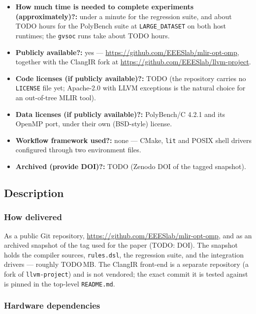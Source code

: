 {\begin{itemize}
    essentially all of it the LLVM build.
  \item {\bf How much time is needed to complete experiments (approximately)?: }
    under a minute for the regression suite, and about TODO hours for the
    PolyBench suite at
    \texttt{LARGE\_DATASET} on both host runtimes; the \texttt{gvsoc} runs take
    about TODO hours.
  \item {\bf Publicly available?: } yes ---
    \url{https://github.com/EEESlab/mlir-opt-omp}, together with the ClangIR
    fork at \url{https://github.com/EEESlab/llvm-project}.
  \item {\bf Code licenses (if publicly available)?: } TODO (the repository
    carries no \texttt{LICENSE} file yet; Apache-2.0 with LLVM exceptions is
    the natural choice for an out-of-tree MLIR tool).
  \item {\bf Data licenses (if publicly available)?: } PolyBench/C 4.2.1 and
    its OpenMP port, under their own (BSD-style) license.
  \item {\bf Workflow framework used?: } none --- CMake, \texttt{lit} and
    POSIX shell drivers configured through two environment files.
  \item {\bf Archived (provide DOI)?: } TODO (Zenodo DOI of the tagged
    snapshot).
\end{itemize}
}

\subsection{Description}

\subsubsection{How delivered}

As a public Git repository, \url{https://github.com/EEESlab/mlir-opt-omp},
and as an archived snapshot of the tag used for the paper (TODO: DOI).  The
snapshot holds the compiler sources, \texttt{rules.dsl}, the regression suite,
and the integration drivers --- roughly
TODO\,MB.  The ClangIR front-end is a separate repository (a fork of
\texttt{llvm-project}) and is not vendored; the exact commit it is tested
against is pinned in the top-level \texttt{README.md}.

\subsubsection{Hardware dependencies}

